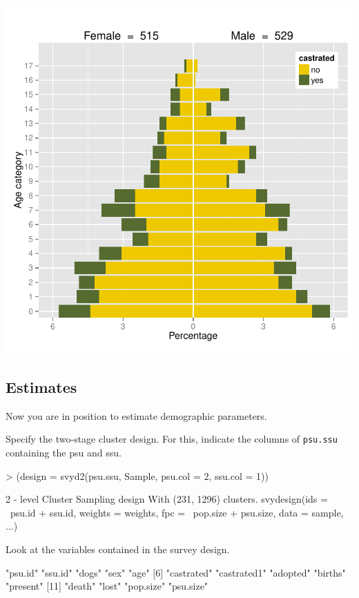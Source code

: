 \documentclass[a4paper]{article}
\begin{document}
\begin{center}
\includegraphics{capm_example-pyramids2}
\end{center}
\subsection{Estimates}
Now you are in position to estimate demographic parameters.

Specify the two-stage cluster design. For this, indicate the columns of \texttt{psu.ssu} containing the psu and ssu.
\begin{Schunk}
\begin{Sinput}
> (design = svyd2(psu.ssu, Sample, psu.col = 2, ssu.col = 1))
\end{Sinput}
\begin{Soutput}
2 - level Cluster Sampling design
With (231, 1296) clusters.
svydesign(ids = ~psu.id + ssu.id, weights = weights, fpc = ~pop.size + 
    psu.size, data = sample, ...)
\end{Soutput}
\end{Schunk}

Look at the variables contained in the survey design.
\begin{Schunk}
\begin{Soutput}
 [1] "psu.id"     "ssu.id"     "dogs"       "sex"        "age"       
 [6] "castrated"  "castrated1" "adopted"    "births"     "present"   
[11] "death"      "lost"       "pop.size"   "psu.size"  
\end{Soutput}
\end{Schunk}
\end{document}
